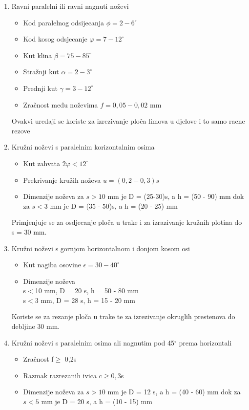 \documentclass[a4paper,12pt]{article}
\numberwithin{figure}{section}
\begin{document}
\begin{enumerate}
\item Ravni paralelni ili ravni nagnuti noževi
\begin{itemize}
\item Kod paralelnog odsijecanja $\phi = 2-6^{\circ}$
\item Kod kosog odsjecanje $\varphi = 7-12^{\circ}$
\item Kut klina $\beta = 75-85^{\circ}$
\item Stražnji kut $\alpha = 2-3^{\circ}$
\item Prednji kut $\gamma = 3-12^{\circ}$
\item Zračnost među noževima $f=0,05-0,02$ mm 
\end{itemize}
Ovakvi uređaji se koriste za izrezivanje ploča limova u djelove i to samo racne rezove
\item Kružni noževi s paralelnim korizontalnim osima
\begin{itemize}
\item Kut zahvata $2\varphi<12^{\circ}$
\item Prekrivanje kružih noževa  $u = (0,2-0,3)s$
\item Dimenzije noževa za $s>10$ mm je D = (25-30)s, a h = (50 - 90) mm dok za $s<3$ mm je D = (35 - 50)s, a h = (20 - 25) mm
\end{itemize}
Primjenjuje se za osdjecanje ploča u trake i za izrazivanje kružnih plotina do s = 30 mm.
\item Kružni noževi s gornjom horizontalnom i donjom kosom osi
\begin{itemize}
\item Kut nagiba osovine $\epsilon = 30-40^{\circ}$
\item Dimenzije noževa \\
s$<$10 mm, D = 20 s, h = 50 - 80 mm\\
s$<$3 mm, D = 28 s, h = 15 - 20 mm
\end{itemize}
 Koriste se za rezanje ploča u trake te za izrezivanje okruglih prestenova do debljine 30 mm.
\item Kružni noževi s paralelnim osima ali nagnutim pod 45$^{\circ}$ prema horizontali 
\begin{itemize}
\item Zračnost f$\geqslant$ 0,2s
\item Razmak razrezanih ivica c$\geqslant 0,3$s
\item Dimenzije noževa za $s>10$ mm je D = 12 s, a h = (40 - 60) mm dok za $s<5$ mm je D = 20 s, a h = (10 - 15) mm

\end{itemize}
\end{enumerate}
\end{document}
